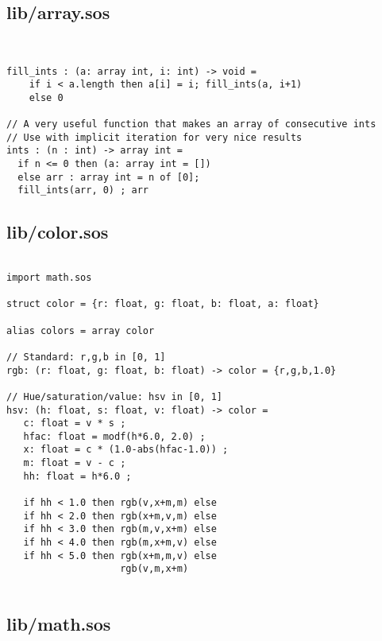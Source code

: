 \documentclass[main.tex]{subfiles}
\begin{document}
\subsection{lib/array.sos}

\begin{lstlisting}


fill_ints : (a: array int, i: int) -> void = 
    if i < a.length then a[i] = i; fill_ints(a, i+1)
    else 0

// A very useful function that makes an array of consecutive ints
// Use with implicit iteration for very nice results
ints : (n : int) -> array int = 
  if n <= 0 then (a: array int = [])
  else arr : array int = n of [0];
  fill_ints(arr, 0) ; arr
\end{lstlisting}

\subsection{lib/color.sos}

\begin{lstlisting}

import math.sos

struct color = {r: float, g: float, b: float, a: float}

alias colors = array color

// Standard: r,g,b in [0, 1]
rgb: (r: float, g: float, b: float) -> color = {r,g,b,1.0}

// Hue/saturation/value: hsv in [0, 1]
hsv: (h: float, s: float, v: float) -> color =
   c: float = v * s ;
   hfac: float = modf(h*6.0, 2.0) ;
   x: float = c * (1.0-abs(hfac-1.0)) ;
   m: float = v - c ;
   hh: float = h*6.0 ;

   if hh < 1.0 then rgb(v,x+m,m) else
   if hh < 2.0 then rgb(x+m,v,m) else
   if hh < 3.0 then rgb(m,v,x+m) else
   if hh < 4.0 then rgb(m,x+m,v) else
   if hh < 5.0 then rgb(x+m,m,v) else
                    rgb(v,m,x+m)
    
\end{lstlisting}

\subsection{lib/math.sos}
\end{document}
